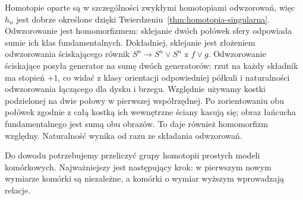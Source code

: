 Homotopie oparte są w
szczególności zwykłymi
homotopiami odwzorowań, więc
$h_n$ jest dobrze
określone dzięki
Twierdzeniu~\ref{thm:homotopia-singularna}.
Odwzorowanie jest homomorfizmem:
sklejanie dwóch połówek
sfery odpowiada sumie
ich klas fundamentalnych.
Dokładniej, sklejanie jest złożeniem odwzorowania ściskającego równik
$S^n\to S^n\vee S^n$ z $f\vee g$. Odwzorowanie ściskające posyła
generator na sumę dwóch generatorów: rzut na każdy składnik
ma stopień $+1$, co widać z klasy orientacji odpowiedniej półkuli
i naturalności odwzorowania łączącego dla dysku i brzegu.
Względnie używamy kostki podzielonej na dwie połowy w pierwszej współrzędnej.
Po zorientowaniu obu połówek zgodnie z całą kostką ich wewnętrzne
ściany kasują się; obraz łańcucha fundamentalnego jest sumą obu obrazów.
To daje również homomorfizm względny. Naturalność wynika od razu ze składania odwzorowań.

Do dowodu potrzebujemy
przeliczyć grupy homotopii
prostych modeli komórkowych.
Najważniejszy jest
następujący krok: w
pierwszym nowym wymiarze
komórki są niezależne,
a komórki o wymiar
wyższym wprowadzają
relacje.

